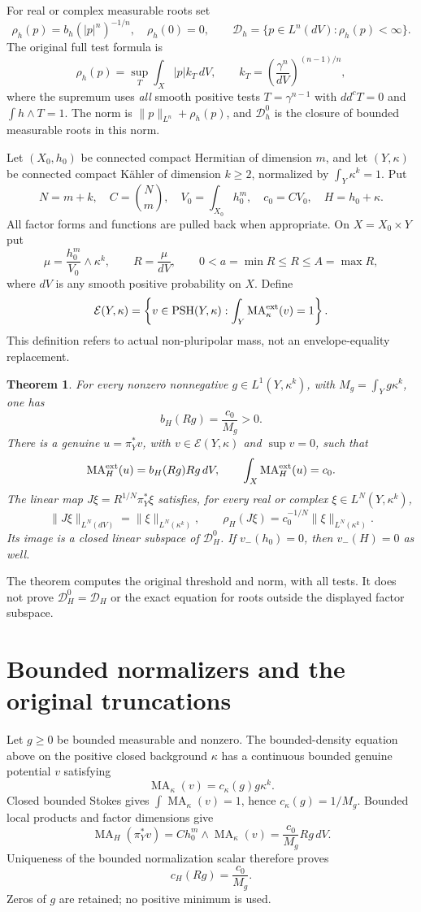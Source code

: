 \documentclass[11pt]{article}
\newcommand{\ddc}{dd^c}
\newcommand{\MA}{\operatorname{MA}}
\newcommand{\PSH}{\operatorname{PSH}}
\newtheorem{theorem}{Theorem}
\theoremstyle{remark}\newtheorem{remark}[theorem]{Remark}
\begin{document}
For real or complex measurable roots set
\[
 \rho_h(p)=b_h(|p|^n)^{-1/n},\quad\rho_h(0)=0,
 \qquad
 \mathcal D_h=\{p\in L^n(dV):\rho_h(p)<\infty\}.
\]
The original full test formula is
\[
 \rho_h(p)=\sup_T\int_X |p|k_T\,dV,
 \qquad k_T=\left(\frac{\gamma^n}{dV}\right)^{(n-1)/n},
\]
where the supremum uses \emph{all} smooth positive tests
$T=\gamma^{n-1}$ with $\ddc T=0$ and $\int h\wedge T=1$.
The norm is $\|p\|_{L^n}+\rho_h(p)$, and $\mathcal D_h^0$ is the
closure of bounded measurable roots in this norm.

Let $(X_0,h_0)$ be connected compact Hermitian of dimension $m$, and
let $(Y,\kappa)$ be connected compact K\"ahler of dimension $k\geq2$,
normalized by $\int_Y\kappa^k=1$. Put
\[
 N=m+k,\quad C=\binom Nm,\quad V_0=\int_{X_0}h_0^m,
 \quad c_0=CV_0,\quad H=h_0+\kappa.
\]
All factor forms and functions are pulled back when appropriate. On
$X=X_0\times Y$ put
\[
 \mu=\frac{h_0^m}{V_0}\wedge\kappa^k,
 \qquad R=\frac\mu{dV},\qquad 0<a=\min R\leq R\leq A=\max R,
\]
where $dV$ is any smooth positive probability on $X$. Define
\[
 \mathcal E(Y,\kappa)=
 \left\{v\in\PSH(Y,\kappa):
       \int_Y\MA_\kappa^{\rm ext}(v)=1\right\}.
\]
This definition refers to actual non-pluripolar mass, not an
envelope-equality replacement.

\begin{theorem}\label{th:main}
For every nonzero nonnegative $g\in L^1(Y,\kappa^k)$, with
$M_g=\int_Yg\kappa^k$, one has
\[
 b_H(Rg)=\frac{c_0}{M_g}>0.
\]
There is a genuine $u=\pi_Y^*v$, with
$v\in\mathcal E(Y,\kappa)$ and $\sup v=0$, such that
\[
 \MA_H^{\rm ext}(u)=b_H(Rg)Rg\,dV,
 \qquad\int_X\MA_H^{\rm ext}(u)=c_0.
\]
The linear map $J\xi=R^{1/N}\pi_Y^*\xi$ satisfies, for every real
or complex $\xi\in L^N(Y,\kappa^k)$,
\[
 \|J\xi\|_{L^N(dV)}=\|\xi\|_{L^N(\kappa^k)},\qquad
 \rho_H(J\xi)=c_0^{-1/N}\|\xi\|_{L^N(\kappa^k)}.
\]
Its image is a closed linear subspace of $\mathcal D_H^0$.
If $v_-(h_0)=0$, then $v_-(H)=0$ as well.
\end{theorem}

The theorem computes the original threshold and norm, with all tests.
It does not prove $\mathcal D_H^0=\mathcal D_H$ or the exact equation
for roots outside the displayed factor subspace.

\section{Bounded normalizers and the original truncations}
Let $g\geq0$ be bounded measurable and nonzero. The
bounded-density equation above on the positive closed background $\kappa$
has a continuous bounded genuine potential $v$ satisfying
\[
 \MA_\kappa(v)=c_\kappa(g)g\kappa^k.
\]
Closed bounded Stokes gives $\int\MA_\kappa(v)=1$, hence
$c_\kappa(g)=1/M_g$. Bounded local products and factor dimensions give
\[
 \MA_H(\pi_Y^*v)=C h_0^m\wedge\MA_\kappa(v)
                  =\frac{c_0}{M_g}Rg\,dV.
\]
Uniqueness of the bounded normalization scalar therefore proves
\begin{equation}\label{eq:bounded}
 c_H(Rg)=\frac{c_0}{M_g}.
\end{equation}
Zeros of $g$ are retained; no positive minimum is used.
\end{document}
